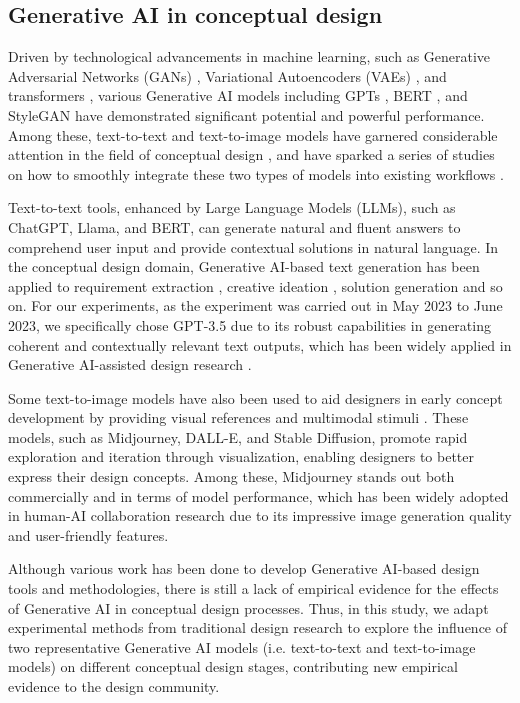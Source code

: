 \subsection{Generative AI in conceptual design}
Driven by technological advancements in machine learning, such as Generative Adversarial Networks (GANs) \citep{goodfellow2014generative}, Variational Autoencoders (VAEs) \citep{kingma2014auto}, and transformers \citep{vaswani2017attention}, various Generative AI models including GPTs \citep{radford2018improving}, BERT \citep{kenton2019bert}, and StyleGAN \citep{karras2019style} have demonstrated significant potential and powerful performance. Among these, text-to-text and text-to-image models have garnered considerable attention in the field of conceptual design \citep{wu2024integrating}, and have sparked a series of studies on how to smoothly integrate these two types of models into existing workflows \citep{mahdavi2024ai, guo2024exploring}. 

Text-to-text tools, enhanced by Large Language Models (LLMs), such as ChatGPT, Llama, and BERT, can generate natural and fluent answers to comprehend user input and provide contextual solutions in natural language. In the conceptual design domain, Generative AI-based text generation has been applied to requirement extraction \citep{shahin2024harnessing}, creative ideation \citep{suh2024luminate}, solution generation \citep{chen2024triz} and so on. For our experiments, as the experiment was carried out in May 2023 to June 2023, we specifically chose GPT-3.5 due to its robust capabilities in generating coherent and contextually relevant text outputs, which has been widely applied in Generative AI-assisted design research \citep{chen2024designfusion, chen2024llm, chen2024beyond}. 

Some text-to-image models have also been used to aid designers in early concept development by providing visual references and multimodal stimuli \citep{kwon2023understanding}. These models, such as Midjourney, DALL-E, and Stable Diffusion, promote rapid exploration and iteration through visualization, enabling designers to better express their design concepts. Among these, Midjourney stands out both commercially and in terms of model performance, which has been widely adopted in human-AI collaboration research \citep{tan2024using, wadinambiarachchi2024effects, mahdavi2024ai} due to its impressive image generation quality and user-friendly features.

Although various work has been done to develop Generative AI-based design tools and methodologies, there is still a lack of empirical evidence for the effects of Generative AI in conceptual design processes. Thus, in this study, we adapt experimental methods from traditional design research to explore the influence of two representative Generative AI models (i.e. text-to-text and text-to-image models) on different conceptual design stages, contributing new empirical evidence to the design community. 

